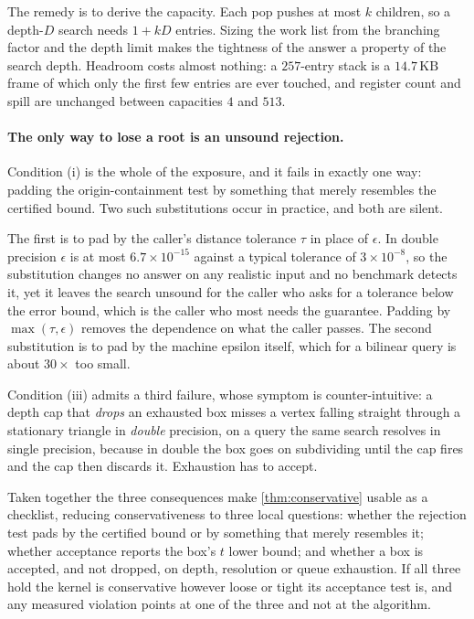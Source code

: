 The remedy is to derive the capacity. Each pop pushes at most $k$ children, so a
depth-$D$ search needs $1 + kD$ entries. Sizing the work list from the branching
factor and the depth limit makes the tightness of the answer a property of the
search depth. Headroom costs almost nothing: a $257$-entry stack is a
$14.7\,\mathrm{KB}$ frame of which only the first few entries are ever touched,
and register count and spill are unchanged between capacities $4$ and $513$.

\paragraph{The only way to lose a root is an unsound rejection.} Condition (i)
is the whole of the exposure, and it fails in exactly one way: padding the
origin-containment test by something that merely resembles the certified bound.
Two such substitutions occur in practice, and both are silent.

The first is to pad by the caller's distance tolerance $\tau$ in place of
$\epsilon$. In double precision $\epsilon$ is at most $6.7\times10^{-15}$ against
a typical tolerance of $3\times10^{-8}$, so the substitution changes no answer on
any realistic input and no benchmark detects it, yet it leaves the search unsound
for the caller who asks for a tolerance below the error bound, which is the
caller who most needs the guarantee. Padding by $\max(\tau,\epsilon)$ removes the
dependence on what the caller passes. The second substitution is to pad by the
machine epsilon itself, which for a bilinear query is about $30\times$ too small.

Condition (iii) admits a third failure, whose symptom is counter-intuitive: a
depth cap that \emph{drops} an exhausted box misses a vertex falling straight
through a stationary triangle in \emph{double} precision, on a query the same
search resolves in single precision, because in double the box goes on
subdividing until the cap fires and the cap then discards it. Exhaustion has to
accept.

Taken together the three consequences make \cref{thm:conservative} usable as a
checklist, reducing conservativeness to three local questions: whether the
rejection test pads by the certified bound or by something that merely resembles
it; whether acceptance reports the box's $t$ lower bound; and whether a box is
accepted, and not dropped, on depth, resolution or queue exhaustion. If all
three hold the kernel is conservative however loose or tight its acceptance test
is, and any measured violation points at one of the three and not at the
algorithm.
